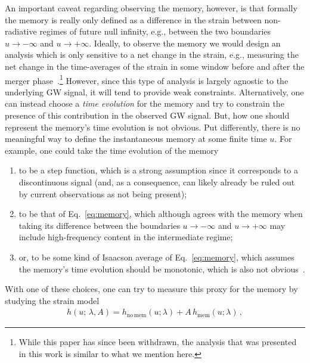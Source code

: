 \documentclass[aps,prd,reprint,twocolumn,10pt,eqsecnum,showpacs,nofootinbib,amsfonts,amssymb,amsmath,longbibliography,superscriptaddress,floatfix]{revtex4-1}
\begin{document}
An important caveat regarding observing the memory, however, is that formally the memory is really only defined as a difference in the strain between non-radiative regimes of future null infinity, e.g., between the two boundaries $u\rightarrow-\infty$ and $u\rightarrow+\infty$. Ideally, to observe the memory we would design an analysis which is only sensitive to a net change in the strain, e.g., measuring the net change in the time-averages of the strain in some window before and after the merger phase~\cite{Scargle:2021lqz}.\footnote{While this paper has since been withdrawn, the analysis that was presented in this work is similar to what we mention here.} However, since this type of analysis is largely agnostic to the underlying GW signal, it will tend to provide weak constraints. Alternatively, one can instead choose a \emph{time evolution} for the memory and try to constrain the presence of this contribution in the observed GW signal. But, how one should represent the memory's time evolution is not obvious. Put differently, there is no meaningful way to define the instantaneous memory at some finite time $u$. For example, one could take the time evolution of the memory 
\begin{enumerate}
	\item to be a step function, which is a strong assumption since it corresponds to a discontinuous signal (and, as a consequence, can likely already be ruled out by current observations as not being present);
	\item to be that of Eq.~\eqref{eq:memory}, which although agrees with the memory when taking its difference between the boundaries $u\rightarrow-\infty$ and $u\rightarrow+\infty$ may include high-frequency content in the intermediate regime;
	\item or, to be some kind of Isaacson average of Eq.~\eqref{eq:memory}, which assumes the memory's time evolution should be monotonic, which is also not obvious~\cite{Zosso:2026czc}.
\end{enumerate}
With one of these choices, one can try to measure this proxy for the memory by studying the strain model
\begin{align}
	\label{eq:strainmodel}
	h(u;\,\lambda,A)=h_{\mathrm{no\,mem}}(u;\lambda) + A\,h_{\mathrm{mem}}(u;\lambda) \, ,
\end{align}
\end{document}
